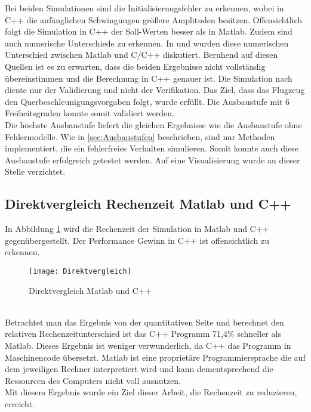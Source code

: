 Bei beiden Simulationen sind die Initialisierungsfehler zu erkennen, wobei in C++ die anfänglichen Schwingungen größere Amplituden besitzen. Offensichtlich folgt die Simulation in C++ der Soll-Werten besser als in Matlab. Zudem sind auch numerische Unterschiede zu erkennen. In \cite{Unbekannt.2012} und \cite{Unbekannt.2011} wurden diese numerischen Unterschied zwischen Matlab und C/C++ diskutiert. Beruhend auf diesen Quellen ist es zu erwarten, dass die beiden Ergebnisse nicht vollständig übereinstimmen und die Berechnung in C++ genauer ist. Die Simulation nach \cite{Olucak.15.02.2017} diente nur der Validierung und nicht der Verifikation. Das Ziel, dass das Flugzeug den Querbeschleunigungsvorgaben folgt, wurde erfüllt. Die Ausbaustufe mit 6 Freiheitsgraden konnte somit validiert werden.\\ Die höchste Ausbaustufe liefert die gleichen Ergebnisse wie die Ausbaustufe ohne Fehlermodelle. Wie in \ref{sec:Ausbaustufen} beschrieben, sind nur Methoden implementiert, die ein fehlerfreies Verhalten simulieren. Somit konnte auch diese Ausbaustufe erfolgreich getestet werden. Auf eine Visualisierung wurde an dieser Stelle verzichtet.
\newpage
\subsection{Direktvergleich Rechenzeit Matlab und C++}
In Abbildung \ref{fig:direktvergleich} wird die Rechenzeit der Simulation in Matlab und C++ gegenübergestellt. Der Performance Gewinn in C++ ist offensichtlich zu erkennen.
\begin{figure}[h]
	\centering
	\texttt{[image: Direktvergleich]}
	\caption{Direktvergleich Matlab und C++}
	\label{fig:direktvergleich}
\end{figure}\noindent \\
Betrachtet man das Ergebnis von der quantitativen Seite und berechnet den relativen Rechenzeitunterschied ist das C++ Programm 71,4\% schneller als Matlab. Dieses Ergebnis ist weniger verwunderlich, da C++ das Programm in Maschinencode übersetzt. Matlab ist eine proprietäre Programmiersprache die auf dem jeweiligen Rechner interpretiert wird und kann dementsprechend die Ressourcen des Computers nicht voll ausnutzen.\\
Mit diesem Ergebnis wurde ein Ziel dieser Arbeit, die Rechenzeit zu reduzieren, erreicht.
